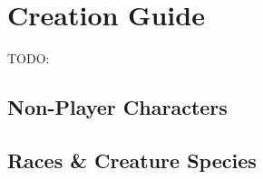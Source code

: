 
\chapter{Creation Guide}

TODO:




\section{Non-Player Characters}

\vspace{0.4em}

% 


\section{Races \& Creature Species}
% 
% 
% 
% 
%

% 
% 
% 
%



